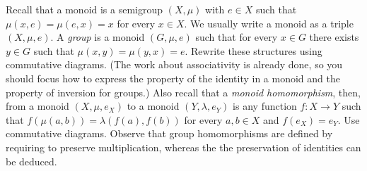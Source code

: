 \begin{exercise}
  Recall that a monoid is a semigroup \((X, \mu)\) with \(e \in X\) such
  that \(\mu(x, e) = \mu(e, x) = x\) for every \(x \in X\). We usually write
  a monoid as a triple \((X, \mu, e)\). A {\em group} is a monoid
  \((G, \mu, e)\) such that for every \(x \in G\) there exists
  \(y \in G\) such that \(\mu(x, y) = \mu(y, x) = e\). Rewrite these
  structures using commutative diagrams. (The work about associativity
  is already done, so you should focus how to express the property of
  the identity in a monoid and the property of inversion for groups.)
  Also recall that a {\em monoid homomorphism}, then, from a monoid
  \((X, \mu, e_X)\) to a monoid \((Y, \lambda, e_Y)\) is any function
  \(f : X \to Y\) such that \(f(\mu(a, b)) = \lambda (f(a), f(b))\) for every
  \(a, b \in X\) and \(f(e_X) = e_Y\). Use commutative diagrams. Observe
  that group homomorphisms are defined by requiring to preserve
  multiplication, whereas the the preservation of identities can be
  deduced.
\end{exercise}



